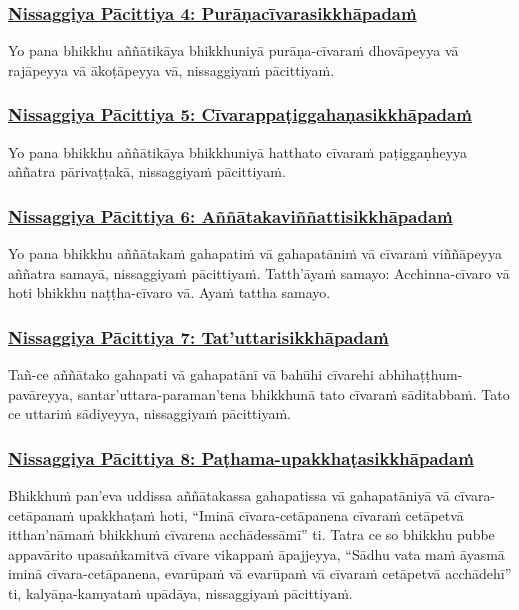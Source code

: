 \subsubsection*{\hyperref[forf-exp4]{Nissaggiya Pācittiya 4: Purāṇacīvarasikkhāpadaṁ}}
\label{np4}

Yo pana bhikkhu aññātikāya bhikkhuniyā purāṇa-cīvaraṁ dhovāpeyya vā rajāpeyya vā ākoṭāpeyya vā, nissaggiyaṁ pācittiyaṁ.

\subsubsection*{\hyperref[forf-exp5]{Nissaggiya Pācittiya 5: Cīvarappaṭiggahaṇasikkhāpadaṁ}}
\label{np5}

Yo pana bhikkhu aññātikāya bhikkhuniyā hatthato cīvaraṁ paṭiggaṇheyya aññatra pārivaṭṭakā, nissaggiyaṁ pācittiyaṁ.

\subsubsection*{\hyperref[forf-exp6]{Nissaggiya Pācittiya 6: Aññātakaviññattisikkhāpadaṁ}}
\label{np6}

Yo pana bhikkhu aññātakaṁ gahapatiṁ vā gahapatāniṁ vā cīvaraṁ viññāpeyya aññatra samayā, nissaggiyaṁ pācittiyaṁ. Tatth'āyaṁ samayo: Acchinna-cīvaro vā hoti bhikkhu naṭṭha-cīvaro vā. Ayaṁ tattha samayo.

\subsubsection*{\hyperref[forf-exp7]{Nissaggiya Pācittiya 7: Tat'uttarisikkhāpadaṁ}}
\label{np7}

Tañ-ce aññātako gahapati vā gahapatānī vā bahūhi cīvarehi abhihaṭṭhum-pavāreyya, santar'uttara-paraman'tena bhikkhunā tato cīvaraṁ sāditabbaṁ. Tato ce uttariṁ sādiyeyya, nissaggiyaṁ pācittiyaṁ.

\subsubsection*{\hyperref[forf-exp8]{Nissaggiya Pācittiya 8: Paṭhama-upakkhaṭasikkhāpadaṁ}}
\label{np8}

Bhikkhuṁ pan'eva uddissa aññātakassa gahapatissa vā gahapatāniyā vā cīvara-cetāpanaṁ upakkhaṭaṁ hoti, “Iminā cīvara-cetāpanena cīvaraṁ cetāpetvā itthan'nāmaṁ bhikkhuṁ cīvarena acchādessāmī” ti. Tatra ce so bhikkhu pubbe appavārito upasaṅkamitvā cīvare vikappaṁ āpajjeyya, “Sādhu vata maṁ āyasmā iminā cīvara-cetāpanena, evarūpaṁ vā evarūpaṁ vā cīvaraṁ cetāpetvā acchādehī” ti, kalyāṇa-kamyataṁ upādāya, nissaggiyaṁ pācittiyaṁ.

